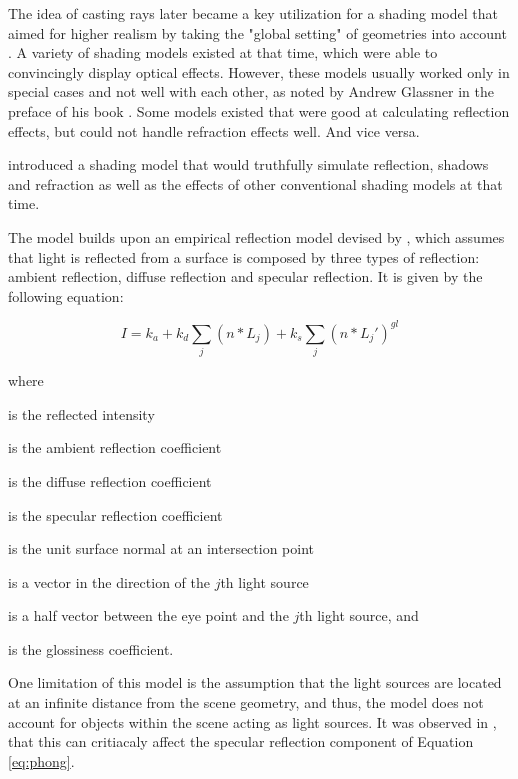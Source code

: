 The idea of casting rays later became a key utilization for a shading model that aimed for higher realism by taking the "global setting" of geometries into account \cite{whitted1979improved}. A variety of shading models existed at that time, which were able to convincingly display optical effects. However, these models usually worked only in special cases and not well with each other, as noted by Andrew Glassner in the preface of his book  \cite{glassner1989introduction}.  Some models existed that were good at calculating reflection effects, but could not handle refraction effects well. And vice versa. 

\cite{whitted1979improved} introduced a shading model that would truthfully simulate reflection, shadows and refraction as well as the effects of other conventional shading models at that time.  

The model builds upon an empirical reflection model devised by \cite{phong1975illumination}, which assumes that light is reflected from a surface is composed by three types of reflection: ambient reflection, diffuse reflection and specular reflection. It is given by the following equation:

\begin{equation} \label{eq:phong}
I = k_{a} + k_{d}\sum_{j}(n*L_{j}) + k_{s}\sum_{j}(n*L_{j}\prime)^{gl}
\end{equation}

\noindent where
\begin{description}
	\setlength\itemsep{0.05em}
	\item  [$I$] is the reflected intensity
	\item  [$I_{a}$] is the ambient reflection coefficient
	\item  [$k_{d}$] is the diffuse reflection coefficient
	\item  [$k_{s}$] is the specular reflection coefficient
	\item  [$n$] is the unit surface normal at an intersection point
	\item  [$L_{j}$] is a vector in the direction of the $j$th light source
	\item  [$L_{j}\prime$] is a half vector between the eye point and the $j$th light source, and
	\item  [$gl$] is the glossiness coefficient.
\end{description}

One limitation of this model is the assumption that the light sources are located at an infinite distance from the scene geometry, and thus, the model does not account for objects within the scene acting as light sources. It was observed in \cite{newell1977progression}, that this can critiacaly affect the specular reflection component of Equation \ref{eq:phong}.

